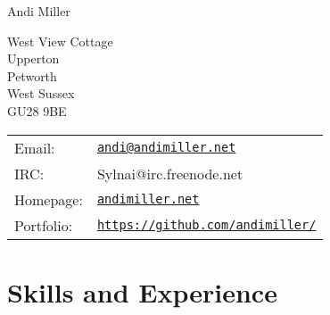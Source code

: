 \documentclass[a4paper]{article}
\def\name{Andi Miller}
\renewenvironment{itemize}{
  \begin{list}{}{
    \setlength{\leftmargin}{1.5em}
  }
}{
  \end{list}
}
\begin{document}
{\huge \name}


\vspace{0.25in}

\begin{minipage}{0.45\linewidth}
  West View Cottage \\
  Upperton \\
  Petworth \\
  West Sussex\\
  GU28 9BE\\
\end{minipage}
\begin{minipage}{0.45\linewidth}
  \begin{tabular}{ll}
    Email: & \href{mailto:andi@andimiller.net}{\tt andi@andimiller.net} \\
    IRC: & Sylnai@irc.freenode.net \\
    Homepage: & \href{http://andimiller.net/}{\tt andimiller.net} \\
    Portfolio: & \href{https://github.com/andimiller/}{\tt https://github.com/andimiller/}
  \end{tabular}
\end{minipage}



\section*{Skills and Experience}


\end{document}
